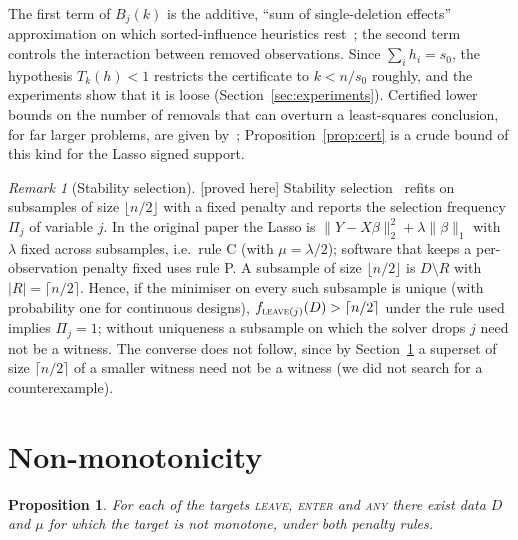 \documentclass[10pt,a4paper]{article}
\theoremstyle{plain}
\newtheorem{proposition}[theorem]{Proposition}
\theoremstyle{definition}
\theoremstyle{remark}
\newtheorem{remark}[theorem]{Remark}
\newcommand{\status}[1]{\textnormal{\textsf{\small [#1]}}}
\newcommand{\Dm}{D\setminus R}
\newcommand{\Tk}{T_k}
\newcommand{\tsc}[1]{\textnormal{\textsc{#1}}}  %
\begin{document}
The first term of $B_j(k)$ is the additive, ``sum of single-deletion effects'' approximation on which sorted-influence heuristics rest~\citep{broderick2020}; the second term controls the interaction between removed observations. Since $\sum_ih_i=s_0$, the hypothesis $\Tk(h)<1$ restricts the certificate to $k<n/s_0$ roughly, and the experiments show that it is loose (Section~\ref{sec:experiments}). Certified lower bounds on the number of removals that can overturn a least-squares conclusion, for far larger problems, are given by~\citet{rubinstein2025}; Proposition~\ref{prop:cert} is a crude bound of this kind for the Lasso signed support.

\begin{remark}[Stability selection]\label{rem:stabsel}\status{proved here}
Stability selection~\citep{meinshausen2010} refits on subsamples of size $\lfloor n/2\rfloor$ with a fixed penalty and reports the selection frequency $\Pi_j$ of variable $j$. In the original paper the Lasso is $\lVert Y-X\beta\rVert_2^2+\lambda\lVert\beta\rVert_1$ with $\lambda$ fixed across subsamples, i.e.\ rule C (with $\mu=\lambda/2$); software that keeps a per-observation penalty fixed uses rule P. A subsample of size $\lfloor n/2\rfloor$ is $\Dm$ with $|R|=\lceil n/2\rceil$. Hence, if the minimiser on every such subsample is unique (with probability one for continuous designs), $f_{\tsc{leave}(j)}(D)>\lceil n/2\rceil$ under the rule used implies $\Pi_j=1$; without uniqueness a subsample on which the solver drops $j$ need not be a witness. The converse does not follow, since by Section~\ref{sec:nonmono} a superset of size $\lceil n/2\rceil$ of a smaller witness need not be a witness (we did not search for a counterexample).
\end{remark}

\section{Non-monotonicity}\label{sec:nonmono}

\begin{proposition}\label{prop:nonmono}
For each of the targets \tsc{leave}, \tsc{enter} and \tsc{any} there exist data $D$ and $\mu$ for which the target is not monotone, under both penalty rules.
\end{proposition}
\end{document}

